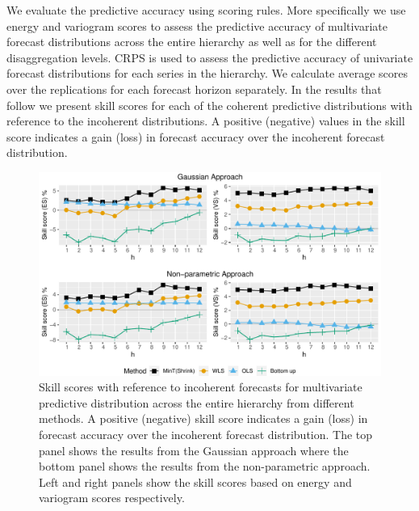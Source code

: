 \documentclass[12pt]{article}
\theoremstyle{definition}
\begin{document}
We evaluate the predictive accuracy using scoring rules. More specifically we use energy and variogram scores to assess the predictive accuracy of multivariate forecast distributions across the entire hierarchy as well as for the different disaggregation levels. CRPS is used to assess the predictive accuracy of univariate forecast distributions for each series in the hierarchy. We calculate average scores over the replications for each forecast horizon separately. In the results that follow we present skill scores for each of the coherent predictive distributions with reference to the incoherent distributions. A positive (negative) values in the skill score indicates a gain (loss) in forecast accuracy over the incoherent forecast distribution.

\begin{figure}
	\centering
	\small
	\includegraphics[width= .95\textwidth]{Empirical-results/AllTS_MultiVScores_ARIMA.pdf}
	\caption{Skill scores with reference to incoherent forecasts for multivariate predictive distribution across the entire hierarchy from different methods. A positive (negative) skill score indicates a gain (loss) in forecast accuracy over the incoherent forecast distribution. The top panel shows the results from the Gaussian approach where the bottom panel shows the results from the non-parametric approach. Left and right panels show the skill scores based on energy and variogram scores respectively.}\label{fig:EmpResults_AllTS}
\end{figure}
\end{document}
